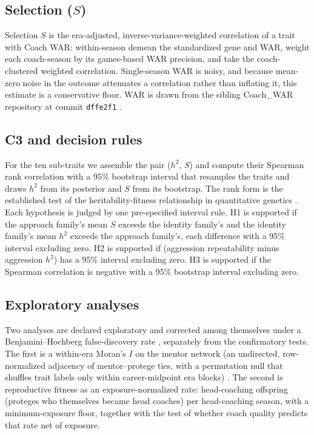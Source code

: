 \documentclass[11pt]{article}
\begin{document}
\subsection{Selection ($S$)}
Selection $S$ is the era-adjusted, inverse-variance-weighted correlation of a trait
with Coach WAR: within-season demean the standardized gene and WAR, weight each
coach-season by its games-based WAR precision, and take the coach-clustered
weighted correlation. Single-season WAR is noisy, and because mean-zero noise in
the outcome attenuates a correlation rather than inflating it, this estimate is a
conservative floor. WAR is drawn from the sibling Coach\_WAR repository at commit
\texttt{dffe2f1} \citep{williamson2026war}.

\subsection{C3 and decision rules}
For the ten sub-traits we assemble the pair ($h^{2}$, $S$) and compute their
Spearman rank correlation with a 95\% bootstrap interval that resamples the traits
and draws $h^{2}$ from its posterior and $S$ from its bootstrap. The rank form is
the established test of the heritability-fitness relationship in quantitative
genetics \citep{mousseauroff1987, kruuk2000}. Each hypothesis is judged by one
pre-specified interval rule. H1 is supported if the approach family's mean $S$
exceeds the identity family's and the identity family's mean $h^{2}$ exceeds the
approach family's, each difference with a 95\% interval excluding zero. H2 is
supported if (aggression repeatability minus aggression $h^{2}$) has a 95\%
interval excluding zero. H3 is supported if the Spearman correlation is negative
with a 95\% bootstrap interval excluding zero.

\subsection{Exploratory analyses}
Two analyses are declared exploratory and corrected among themselves under a
Benjamini--Hochberg false-discovery rate \citep{benjamini1995}, separately from the
confirmatory tests. The first is a within-era Moran's $I$ on the mentor network (an
undirected, row-normalized adjacency of mentor--protege ties, with a permutation
null that shuffles trait labels only within career-midpoint era blocks)
\citep{moran1950}. The second is reproductive fitness as an exposure-normalized
rate: head-coaching offspring (proteges who themselves became head coaches) per
head-coaching season, with a minimum-exposure floor, together with the test of
whether coach quality predicts that rate net of exposure.
\end{document}
